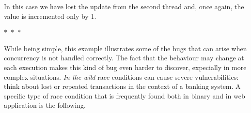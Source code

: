 \noindent
In this case we have lost the update from the second thread and, once again, the value is incremented only by 1.

\begin{center}
  $\ast$~$\ast$~$\ast$
\end{center}

While being simple, this example illustrates some of the bugs that can arise when concurrency is not handled correctly. The fact that the behaviour may change at each execution makes this kind of bug even harder to discover, expecially in more complex situations. \textit{In the wild} race conditions can cause severe vulnerabilities: think about lost or repeated transactions in the context of a banking system. A specific type of race condition that is frequently found both in binary and in web application is the following.
